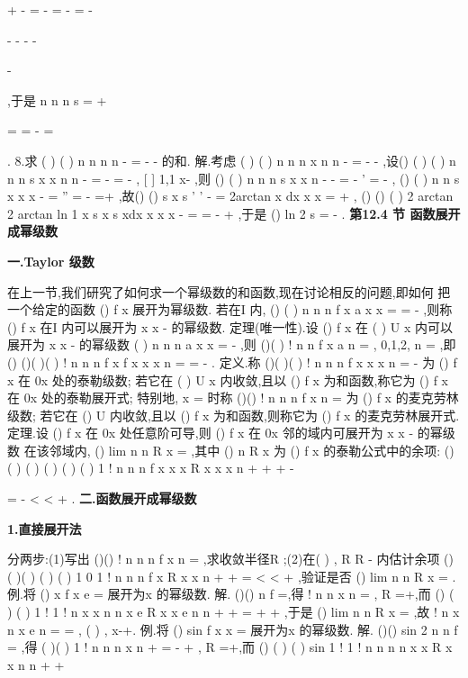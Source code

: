 +
-
=
-
=
-
=
-




-
-
-
-


-


\sum 
\sum 
\sum 
,于是 
n
n
n
s
\infty 
=
+


=
=
-
=




\sum 
. 
8.求
(
)
(
)
n
n
n
n
-
\infty 
=
-
-
\sum 
的和. 
解.考虑
(
)
(
)
n
n
n
x
n
n
-
\infty 
=
-
-
\sum 
,设()
(
)
(
)
n
n
n
s x
x
n
n
-
\infty 
=
-
=
-
\sum 
,
[
]
1,1
x\in -
,则 
()
(
)
n
n
n
s
x
x
n
-
\infty 
-
=
-
'
=
-
\sum 
,
()
(
)
n
n
s
x
x
x
\infty 
-
=
''
=
-
=+
\sum 
,故()
()
s x
s
'
'
-
= 
2arctan
x
dx
x
x
=
+
\int 
, ()
()
(
)
2 arctan
2 arctan
ln 1
x
s x
s
xdx
x
x
x
-
=
=
-
+
\int 
,于是 
()
ln 2
s
\pi 
=
-
. 
\vspace{6pt}
{\large \bfseries \textcolor{lyred}{第12.4 节 函数展开成幂级数}}

\vspace{4pt}
{\bfseries \textcolor{lyred}{一.Taylor 级数}}

在上一节,我们研究了如何求一个幂级数的和函数,现在讨论相反的问题,即如何 
把一个给定的函数
()
f x 展开为幂级数. 
若在I 内,
()
(
)
n
n
n
f x
a
x
x
\infty 
=
=
-
\sum 
,则称
()
f x 在I 内\textcolor{lyred}{可以展开为}
x
x
-
\textcolor{lyred}{的幂级数}. 
\textcolor{lyred}{定理(唯一性)}.设
()
f x 在
(
)
U x
内可以展开为
x
x
-
的幂级数
(
)
n
n
n
a
x
x
\infty 
=
-
\sum 
,则 
()(
)
!
n
n
f
x
a
n
=
,
0,1,2,
n =
\Lambda ,即
()
()(
)(
)
!
n
n
n
f
x
f x
x
x
n
\infty 
=
=
-
\sum 
. 
\textcolor{lyred}{定义}.称
()(
)(
)
!
n
n
n
f
x
x
x
n
\infty 
=
-
\sum 
为
()
f x 在
0x 处的\textcolor{lyred}{泰勒级数}; 
若它在
(
)
U x
内收敛,且以
()
f x 为和函数,称它为
()
f x 在
0x 处的\textcolor{lyred}{泰勒展开式}; 
特别地,
x =
时称
()()
!
n
n
n
f
x
n
\infty 
=\sum 
为
()
f x 的\textcolor{lyred}{麦克劳林级数}; 
若它在
()
U
内收敛,且以
()
f x 为和函数,则称它为
()
f x 的\textcolor{lyred}{麦克劳林展开式}. 
\textcolor{lyred}{定理}.设
()
f x 在
0x 处任意阶可导,则
()
f x 在
0x 邻的域内可展开为
x
x
-
的幂级数 
\Leftrightarrow 在该邻域内,
()
lim
n
n
R
x
\to \infty 
=
,其中
()
n
R
x 为
()
f x 的泰勒公式中的余项: 
()
(
)
(
)
(
)
(
)
(
)
1 !
n
n
n
f
x
x
x
R
x
x
x
n
\theta 
\theta 
+
+
+
-




=
-
<
<
+
. 
\vspace{4pt}
{\bfseries \textcolor{lyred}{二.函数展开成幂级数}}

{\bfseries \textcolor{lyred}{1.直接展开法}}

分两步:(1)写出
()()
!
n
n
n
f
x
n
\infty 
=\sum 
,求收敛半径R ;(2)在(
)
,
R R
-
内估计余项 
()
(
)(
)
(
)
(
)
1 0
1 !
n
n
n
f
x
R
x
x
n
\theta 
\theta 
+
+
=
<
<
+
,验证是否
()
lim
n
n
R
x
\to \infty 
=
. 
\textcolor{lyred}{例}.将
()
x
f x
e
=
展开为x 的幂级数. 
解.
()()
n
f
=,得
!
n
n
x
n
\infty 
=\sum 
, R =+\infty ,而
()
(
)
(
)
1 !
1 !
n
x
x
n
n
x
e
R
x
x
e
n
n
\theta 
+
+
=
\le 
+
+
,于是 
()
lim
n
n
R
x
\to \infty 
=
,故
!
n
x
n
x
e
n
\infty 
=
=\sum 
,
(
)
,
x\in -\infty +\infty . 
\textcolor{lyred}{例}.将
()
sin
f x
x
=
展开为x 的幂级数. 
解.
()()
sin 2
n
n
f
\pi 
=
,得
(
)(
)
1 !
n
n
n
x
n
+
\infty 
=
-
+
\sum 
, R =+\infty ,而 
()
(
)
(
)
sin
1 !
1 !
n
n
n
n
x
x
R
x
x
n
n
\pi 
\theta 
+
+


